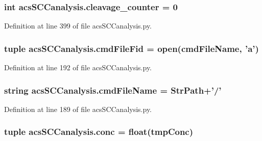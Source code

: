 \hypertarget{a00097_a0dd6730b063ac11ae4620c4a0778f6d9}{
\subsubsection[{cleavage\-\_\-counter}]{\setlength{\rightskip}{0pt plus 5cm}int acs\-S\-C\-Canalysis.\-cleavage\-\_\-counter = 0}}\label{a00097_a0dd6730b063ac11ae4620c4a0778f6d9}


Definition at line 399 of file acs\-S\-C\-Canalysis.\-py.

\hypertarget{a00097_a0a501feb02e67bd6a8ba75490709cf89}{
\subsubsection[{cmd\-File\-Fid}]{\setlength{\rightskip}{0pt plus 5cm}tuple acs\-S\-C\-Canalysis.\-cmd\-File\-Fid = open({\bf cmd\-File\-Name}, '{\bf a}')}}\label{a00097_a0a501feb02e67bd6a8ba75490709cf89}


Definition at line 192 of file acs\-S\-C\-Canalysis.\-py.

\hypertarget{a00097_a32551f85ad3cd8080b8ad81828276368}{
\subsubsection[{cmd\-File\-Name}]{\setlength{\rightskip}{0pt plus 5cm}string acs\-S\-C\-Canalysis.\-cmd\-File\-Name = {\bf Str\-Path}+'/'}}\label{a00097_a32551f85ad3cd8080b8ad81828276368}


Definition at line 189 of file acs\-S\-C\-Canalysis.\-py.

\hypertarget{a00097_a6ec435b19c74f79f32a0eae7bb2bd1c8}{
\subsubsection[{conc}]{\setlength{\rightskip}{0pt plus 5cm}tuple acs\-S\-C\-Canalysis.\-conc = float(tmp\-Conc)}}\label{a00097_a6ec435b19c74f79f32a0eae7bb2bd1c8}


